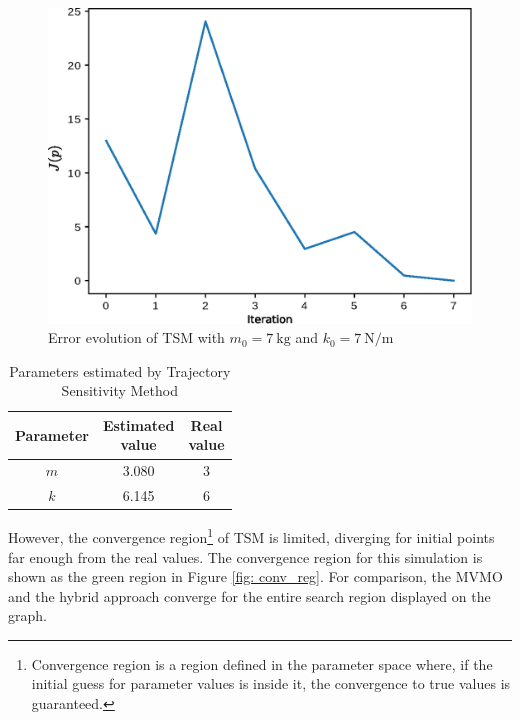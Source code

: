 \begin{figure}[h]
	\caption{Error evolution of TSM with $m_{0} = 7\ \text{kg}$ and $k_{0} = 7\ \text{N/m}$}
	\begin{center}
		\includegraphics[scale=0.6]{Images/TS_conv.eps}
	\end{center}
	\label{fig: TS_conv}
\end{figure}

\begin{table}[h]
	\caption{Parameters estimated by Trajectory Sensitivity Method}
	\begin{center}
		\begin{tabular}{c|c|c}
			Parameter & \shortstack{Estimated \\ value} & \shortstack{Real \\ value} \\
			\hline
			$m$ & 3.080 & 3 \\
			$k$ & 6.145 & 6 \\
		\end{tabular}
	\end{center}
	\label{tab: spring_mass_ts}
\end{table}

However, the convergence region\footnote{Convergence region is a region defined in the parameter space where, if the initial guess for parameter values is inside it, the convergence to true values is guaranteed.} of TSM is limited, diverging for initial points far enough from the real values. The convergence region for this simulation is shown as the green region in Figure \ref{fig: conv_reg}. For comparison, the MVMO and the hybrid approach converge for the entire search region displayed on the graph.

